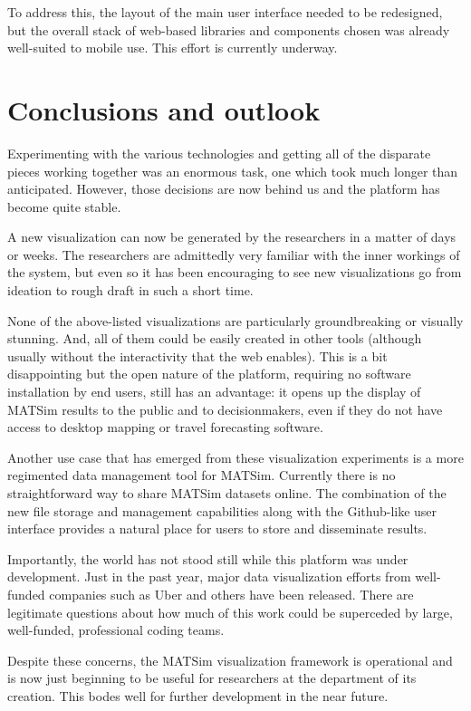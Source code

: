 \documentclass[Afour,sagev,times]{sagej}
\begin{document}
To address this, the layout of the main user interface needed to be redesigned, but the overall stack of web-based libraries and components chosen was already well-suited to mobile use. This effort is currently underway.

\section{Conclusions and outlook}

Experimenting with the various technologies and getting all of the disparate pieces working together was an enormous task, one which took much longer than anticipated. However, those decisions are now behind us and the platform has become quite stable.

A new visualization can now be generated by the researchers in a matter of days or weeks. The researchers are admittedly very familiar with the inner workings of the system, but even so it has been encouraging to see new visualizations go from ideation to rough draft in such a short time.

None of the above-listed visualizations are particularly groundbreaking or visually stunning. And, all of them could be easily created in other tools (although usually without the interactivity that the web enables). This is a bit disappointing but the open nature of the platform, requiring no software installation by end users, still has an advantage: it opens up the display of MATSim results to the public and to decisionmakers, even if they do not have access to desktop mapping or travel forecasting software.

Another use case that has emerged from these visualization experiments is a more regimented data management tool for MATSim. Currently there is no straightforward way to share MATSim datasets online. The combination of the new file storage and management capabilities along with the Github-like user interface provides a natural place for users to store and disseminate results.

Importantly, the world has not stood still while this platform was under development. Just in the past year, major data visualization efforts from well-funded companies such as Uber and others have been released. There are legitimate questions about how much of this work could be superceded by large, well-funded, professional coding teams.

Despite these concerns, the MATSim visualization framework is operational and is now just beginning to be useful for researchers at the department of its creation. This bodes well for further development in the near future.
\end{document}
